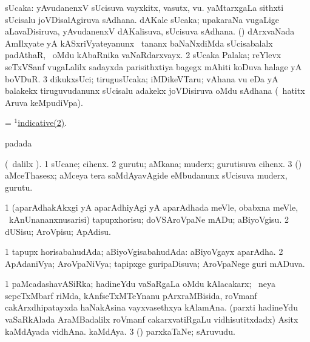 \bentry
{}
\gl{\nA}
\bmng
\bnum
{} sUcaka: 
\banum
{} yAvudanenxV sUcisuva vayxkitx, vasutx, \mo vu. 
 yaMtarxgaLa sithxti sUcisalu joVDisalAgiruva sAdhana. 
 dAKale sUcaka; upakaraNa \mo vugaLige aLavaDisiruva, yAvudanenxV dAKalisuva, sUcisuva sAdhana. 
 (\ravi) dArxvaNada AmIlxyate yA kASxriVyateyanunx \sA\ tananx baNaNxdiMda sUcisabalalx padAthaR, \sA\ oMdu kAbaRnika vaNaRdarxvayx. 
\eanum
\numie
\num{2} sUcaka Palaka; reYlevx seTxVSanf \mo vugaLalilx sadayxda parisithxtiya bagegx mAhiti koDuva halage yA boVDuR. 
\num{3} dikukxsUci; tirugusUcaka; iMDikeVTaru; vAhana \mo vu eDa yA balakekx tiruguvudanunx sUcisalu adakekx joVDisiruva oMdu sAdhana (\kanmu\ hatitx Aruva keMpudiVpa). 
\enum
\emng
\eentry

\bentry
{}
\gl{\gu}
\bmng
 = \hyperlink{indicative(1)2}{$^1$indicative(2)}. 
\emng
\eentry

\bentry
{}
\gl{\nA}
\bmng
{} padada \bava 
\emng
\eentry

\bentry
{}
\gl{\nA}
\bmng
(\kanmu\ \bava dalilx ). 
\bnum
\num{1} sUcane; cihenx. 
\num{2} gurutu; aMkana; muderx; gurutisuva cihenx. 
\num{3} (\ame) aMceThasesx; aMceya tera saMdAyavAgide eMbudanunx sUcisuva muderx, gurutu. 
\enum
\emng
\eentry

\bentry
{}
\gl{\sakirx}
\bmng
\bnum
\num{1} (aparAdhakAkxgi yA aparAdhiyAgi yA aparAdhada meVle, obabxna meVle, \kanmu\ kAnUnananxnusarisi) tapupxhorisu; doVSAroVpaNe mADu; aBiyoVgisu. 
\num{2} dUSisu; AroVpisu; ApAdisu. 
\enum
\emng
\eentry

\bentry
{}
\gl{\gu}
\bmng
\bnum
\num{1} tapupx horisabahudAda; aBiyoVgisabahudAda:  aBiyoVgayx aparAdha. 
\num{2} ApAdaniVya; AroVpaNiVya; tapipxge guripaDisuva; AroVpaNege guri mADuva. 
\enum
\emng
\eentry

\bentry
{}
\gl{\nA}
\bmng
\bnum
\num{1} paMcadashavASiRka; hadineYdu vaSaRgaLa oMdu kAlacakarx; \kirxsha\ neya sepeTxMbarf riMda, kAnfseTxMTeYnanu pArxraMBisida, roVmanf cakArxdhipatayxda haNakAsina vayxvasethxya kAlamAna. 
 (parxti hadineYdu vaSaRkAlada AraMBadalilx roVmanf cakarxvatiRgaLu vidhisutitxdadx) 
\banum
{} Asitx kaMdAyada vidhAna. 
 kaMdAya. 
\eanum
\numie
\num{3} (\pArxparx) parxkaTaNe; sAruvudu. 
\enum
\emng
\eentry

